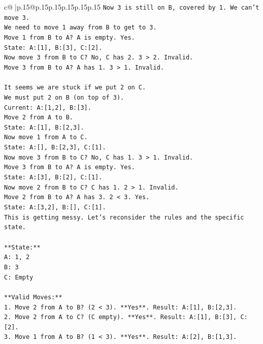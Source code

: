 \documentclass{article}
\begin{document}
{\begin{supertabular}{c@{$\;$}|p{.15\linewidth}@{}p{.15\linewidth}p{.15\linewidth}p{.15\linewidth}p{.15\linewidth}p{.15\linewidth}}
{{{\texttt{Now 3 is still on B, covered by 1. We can't move 3.} \\
\texttt{We need to move 1 away from B to get to 3.} \\
\texttt{Move 1 from B to A? A is empty. Yes.} \\
\texttt{State: A:{[}1{]}, B:{[}3{]}, C:{[}2{]}.} \\
\texttt{Now move 3 from B to C? No, C has 2. 3 > 2. Invalid.} \\
\texttt{Move 3 from B to A? A has 1. 3 > 1. Invalid.} \\
\\ 
\texttt{It seems we are stuck if we put 2 on C.} \\
\texttt{We must put 2 on B (on top of 3).} \\
\texttt{Current: A:{[}1,2{]}, B:{[}3{]}.} \\
\texttt{Move 2 from A to B.} \\
\texttt{State: A:{[}1{]}, B:{[}2,3{]}.} \\
\texttt{Now move 1 from A to C.} \\
\texttt{State: A:{[}{]}, B:{[}2,3{]}, C:{[}1{]}.} \\
\texttt{Now move 3 from B to C? No, C has 1. 3 > 1. Invalid.} \\
\texttt{Move 3 from B to A? A is empty. Yes.} \\
\texttt{State: A:{[}3{]}, B:{[}2{]}, C:{[}1{]}.} \\
\texttt{Now move 2 from B to C? C has 1. 2 > 1. Invalid.} \\
\texttt{Move 2 from B to A? A has 3. 2 < 3. Yes.} \\
\texttt{State: A:{[}3,2{]}, B:{[}{]}, C:{[}1{]}.} \\
\texttt{This is getting messy. Let's reconsider the rules and the specific state.} \\
\\ 
\texttt{**State:**} \\
\texttt{A: 1, 2} \\
\texttt{B: 3} \\
\texttt{C: Empty} \\
\\ 
\texttt{**Valid Moves:**} \\
\texttt{1. Move 2 from A to B? (2 < 3). **Yes**. Result: A:{[}1{]}, B:{[}2,3{]}.} \\
\texttt{2. Move 2 from A to C? (C empty). **Yes**. Result: A:{[}1{]}, B:{[}3{]}, C:{[}2{]}.} \\
\texttt{3. Move 1 from A to B? (1 < 3). **Yes**. Result: A:{[}2{]}, B:{[}1,3{]}.} \\
}}}
\end{supertabular}}
\end{document}
